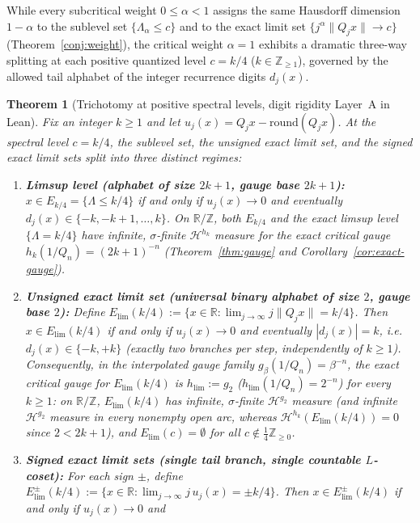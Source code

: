 \documentclass[11pt]{article}
\newtheorem{theorem}{Theorem}
\theoremstyle{definition}
\theoremstyle{remark}
\newcommand{\R}{\mathbb{R}}
\newcommand{\Z}{\mathbb{Z}}
\newcommand{\Lam}{\Lambda}
\begin{document}
While every subcritical weight $0\le\alpha<1$ assigns the same Hausdorff
dimension $1-\alpha$ to the sublevel set $\{\Lam_\alpha\le c\}$ and to the
exact limit set $\{j^\alpha\|Q_jx\|\to c\}$ (Theorem~\ref{conj:weight}), the
critical weight $\alpha=1$ exhibits a dramatic three-way splitting at each
positive quantized level $c=k/4$ ($k\in\Z_{\ge1}$), governed by the allowed
tail alphabet of the integer recurrence digits $d_j(x)$.

\begin{theorem}[Trichotomy at positive spectral levels, digit rigidity Layer~A in Lean]\label{thm:trichotomy}
Fix an integer $k\ge1$ and let $u_j(x)=Q_jx-\mathrm{round}(Q_jx)$. At the
spectral level $c=k/4$, the sublevel set, the unsigned exact limit set, and
the signed exact limit sets split into three distinct regimes:
\begin{enumerate}[label=(\roman*),leftmargin=2em]
\item \textbf{Limsup level (alphabet of size $2k+1$, gauge base $2k+1$):}
$x\in E_{k/4}=\{\Lam\le k/4\}$ if and only if $u_j(x)\to0$ and eventually
$d_j(x)\in\{-k,-k+1,\dots,k\}$. On $\R/\Z$, both $E_{k/4}$ and the exact
limsup level $\{\Lam=k/4\}$ have infinite, $\sigma$-finite $\mathcal H^{h_k}$
measure for the exact critical gauge $h_k(1/Q_n)=(2k+1)^{-n}$
(Theorem~\ref{thm:gauge} and Corollary~\ref{cor:exact-gauge}).
\item \textbf{Unsigned exact limit set (universal binary alphabet of size $2$, gauge base $2$):}
Define $E_{\mathrm{lim}}(k/4):=\{x\in\R:\lim_{j\to\infty}j\|Q_jx\|=k/4\}$.
Then $x\in E_{\mathrm{lim}}(k/4)$ if and only if $u_j(x)\to0$ and eventually
$|d_j(x)|=k$, i.e.\ $d_j(x)\in\{-k,+k\}$ (exactly two branches per step,
\emph{independently} of $k\ge1$). Consequently, in the interpolated gauge
family $g_\beta(1/Q_n)=\beta^{-n}$, the exact critical gauge for
$E_{\mathrm{lim}}(k/4)$ is $h_{\mathrm{lim}}:=g_2$ ($h_{\mathrm{lim}}(1/Q_n)=2^{-n}$)
for \emph{every} $k\ge1$: on $\R/\Z$, $E_{\mathrm{lim}}(k/4)$ has infinite,
$\sigma$-finite $\mathcal H^{g_2}$ measure (and infinite $\mathcal H^{g_2}$
measure in every nonempty open arc, whereas
$\mathcal H^{h_k}(E_{\mathrm{lim}}(k/4))=0$ since $2<2k+1$), and
$E_{\mathrm{lim}}(c)=\emptyset$ for all $c\notin\frac14\Z_{\ge0}$.
\item \textbf{Signed exact limit sets (single tail branch, single countable $L$-coset):}
For each sign $\pm$, define
$E_{\mathrm{lim}}^\pm(k/4):=\{x\in\R:\lim_{j\to\infty}j\,u_j(x)=\pm k/4\}$.
Then $x\in E_{\mathrm{lim}}^\pm(k/4)$ if and only if $u_j(x)\to0$ and

\end{enumerate}
\end{theorem}
\end{document}
